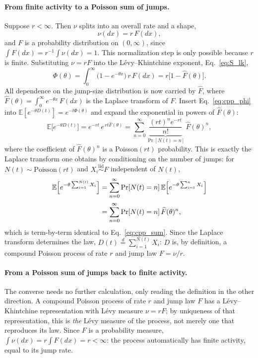 \documentclass[preprint,12pt]{elsarticle}
\begin{document}
\paragraph*{From finite activity to a Poisson sum of jumps.}
Suppose $r<\infty$. Then $\nu$ splits into an overall rate and a shape,
\begin{equation}
  \nu(dx)=r\,F(dx),
\end{equation}
and $F$ is a probability distribution on $(0,\infty)$, since
$\int F(dx)=r^{-1}\int\nu(dx)=1$. This normalization step is only possible
because $r$ is finite.
 Substituting $\nu=rF$ into the L\'evy--Khintchine exponent, Eq.~\eqref{eq:S_lk}, 
\begin{equation}
  \Phi(\theta)=\int_0^\infty\bigl(1-e^{-\theta x}\bigr)\,r\,F(dx)
  =r\bigl[1-\widehat F(\theta)\bigr].
  \label{eq:cpp_phi}
\end{equation}
All dependence on the jump-size distribution is
now carried by $\widehat F$, where 
$\widehat F(\theta)=\int_0^\infty e^{-\theta x}\,F(dx)$ is the
Laplace transform of $F$.
Insert Eq.~\eqref{eq:cpp_phi} into $\mathbb E[e^{-\theta D(t)}]=e^{-t\Phi(\theta)}$
and expand the exponential in powers of $\widehat F(\theta)$:
\begin{equation}
  \mathbb E\bigl[e^{-\theta D(t)}\bigr]
  =e^{-rt}\,e^{\,rt\widehat F(\theta)}
  =\sum_{n=0}^\infty\underbrace{\frac{(rt)^n e^{-rt}}{n!}}_{\Pr[N(t)=n]}\,
    \widehat F(\theta)^n ,
  \label{eq:cpp_sum}
\end{equation}
where the coefficient of $\widehat F(\theta)^n$ is a
Poisson$(rt)$ probability. This is
exactly the Laplace transform one obtains by conditioning on the
number of jumps: for $N(t)\sim\mathrm{Poisson}(rt)$ and
$X_i\stackrel{\mathrm{iid}}{\sim}F$ independent of $N(t)$,
\begin{equation}
\begin{aligned}
  \mathbb E\Bigl[e^{-\theta\sum_{i=1}^{N(t)}X_i}\Bigr]
  &=\sum_{n=0}^\infty\Pr[N(t)=n]\,
     \mathbb E\Bigl[e^{-\theta\sum_{i=1}^nX_i}\Bigr]\\[2pt]
  &=\sum_{n=0}^\infty\Pr[N(t)=n]\,\widehat F(\theta)^n,
\end{aligned}
\end{equation}
which is term-by-term identical to Eq.~\eqref{eq:cpp_sum}. Since the
Laplace transform determines the law, $D(t)\stackrel{d}{=}\sum_{i=1}^{N(t)}X_i$:
$D$ is, by definition, a compound Poisson process of rate $r$ and jump law
$F=\nu/r$.

\paragraph*{From a Poisson sum of jumps back to finite activity.}
The converse needs no further calculation, only reading the definition in
the other direction. A compound Poisson process of rate $r$ and jump
law $F$ has a L\'evy--Khintchine representation with L\'evy measure
$\nu=r F$; by uniqueness of that representation, this is \emph{the}
L\'evy measure of the process, not merely one that reproduces its law.
Since $F$ is a probability measure, $\int\nu(dx)=r\int F(dx)=r<\infty$:
the process automatically has finite activity, equal to its jump rate.
\end{document}
